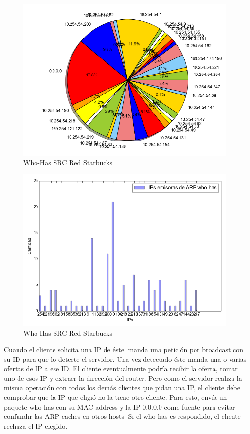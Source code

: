 \FloatBarrier
\begin{center}
	\begin{figure}[ht]
    	\centering
		\includegraphics[width=11cm]{imgs/output_robert_starbucks_24-04-2015_p-arp_who_src-torta.png}
		\caption{Who-Has SRC Red Starbucks}
	\end{figure}
\end{center}
\FloatBarrier
\begin{center}
	\begin{figure}[ht]
    	\centering
		\includegraphics[width=11cm]{imgs/output_robert_starbucks_24-04-2015_p-arp_who_src.png}
		\caption{Who-Has SRC Red Starbucks}
	\end{figure}
\end{center}
\FloatBarrier

\newpage
Cuando el cliente solicita una IP de éste, manda una petición por broadcast con su ID para que lo detecte el servidor. Una vez detectado éste manda una o varias ofertas de IP a ese ID. El cliente eventualmente podría recibir la oferta, tomar uno de esos IP y extraer la dirección del router. Pero como el servidor realiza la misma operación con todos los demás clientes que pidan una IP, el cliente debe comprobar que la IP que eligió no la tiene otro cliente. Para esto, envía un paquete who-has con su MAC address y la IP 0.0.0.0 como fuente para evitar confundir las ARP caches en otros hosts. Si el who-has es respondido, el cliente rechaza el IP elegido.

